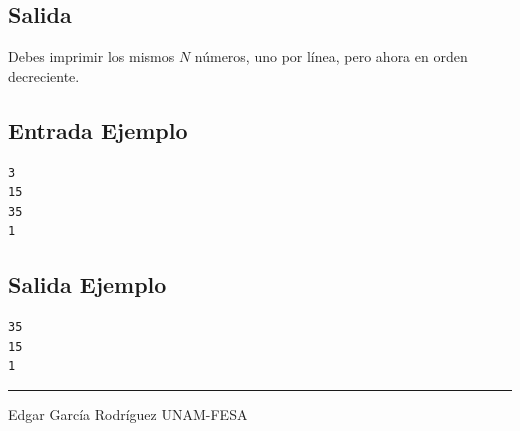 \documentclass[letter,10pt]{article}
\newcommand{\lyxaddress}[1]{
\par {\raggedright #1
\vspace{1.4em}
\noindent\par}
}
\begin{document}
\subsection*{Salida}

Debes imprimir los mismos $N$ números, uno por línea, pero ahora en 
orden decreciente.

\subsection*{Entrada Ejemplo}

\begin{verbatim}
3
15
35
1
\end{verbatim}

\subsection*{Salida Ejemplo}

\begin{verbatim}
35
15
1
\end{verbatim}

\noindent \rule[0.5ex]{1\columnwidth}{1pt}


\lyxaddress{Edgar García Rodríguez UNAM-FESA}
\end{document}
